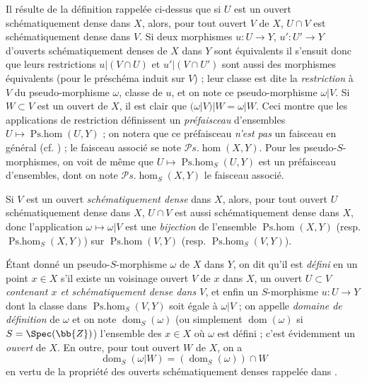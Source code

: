 \begin{env}[20.2.2]
\label{IV.20.2.2}
Il résulte de la définition rappelée ci-dessus que si $U$ est un ouvert schématiquement dense dans $X$, alors, pour tout ouvert $V$ de $X$, $U\cap V$ est schématiquement dense dans $V$.
Si deux morphismes $u:U\to Y$, $u':U'\to Y$ d'ouverts schématiquement denses de $X$ dans $Y$ sont équivalents il s'ensuit donc que leurs restrictions $u|(V\cap U)$ et $u'|(V\cap U')$ sont aussi des morphismes équivalents (pour le préschéma induit sur $V$) ; leur classe est dite la \emph{restriction} à $V$ du pseudo-morphisme $\omega$, classe de $u$, et on note ce pseudo-morphisme $\omega|V$.
Si $W\subset V$ est un ouvert de $X$, il est clair que $(\omega|V)|W=\omega|W$.
Ceci montre que les applications de restriction définissent un \emph{préfaisceau} d'ensembles $U\mapsto\operatorname{Ps.hom}(U,Y)$ ; on notera que ce préfaisceau \emph{n'est pas} un faisceau en général (cf. ) ; le faisceau associé se note $\mathscr{P}\!s.\!\operatorname{hom}(X,Y)$.
Pour les pseudo-$S$-morphismes, on voit de même que $U\mapsto\operatorname{Ps.hom}_S(U,Y)$ est un préfaisceau d'ensembles, dont on note $\mathscr{P}\!s.\!\operatorname{hom}_S(X,Y)$ le faisceau associé.

Si $V$ est un ouvert \emph{schématiquement dense} dans $X$, alors, pour tout ouvert $U$ schématiquement dense dans $X$, $U\cap V$ est aussi schématiquement dense dans $X$, donc l'application $\omega\mapsto\omega|V$ est une \emph{bijection} de l'ensemble $\operatorname{Ps.hom}(X,Y)$ (resp. $\operatorname{Ps.hom}_S(X,Y)$) sur $\operatorname{Ps.hom}(V,Y)$ (resp. $\operatorname{Ps.hom}_S(V,Y)$).
\end{env}

\begin{env}[20.2.3]
\label{IV.20.2.3}
Étant donné un pseudo-$S$-morphisme $\omega$ de $X$ dans $Y$, on dit qu'il est \emph{défini} en un point $x\in X$ s'il existe un voisinage ouvert $V$ de $x$ dans $X$, un ouvert $U\subset V$ \emph{contenant $x$ et schématiquement dense dans $V$}, et enfin un $S$-morphisme $u:U\to Y$ dont la classe dans $\operatorname{Ps.hom}_S(V,Y)$ soit égale à $\omega|V$  ; on appelle \emph{domaine de définition} de $\omega$ et on note $\operatorname{dom}_S(\omega)$ (ou simplement $\operatorname{dom}(\omega)$ si $S=\Spec(\bb{Z})$) l'ensemble des $x\in X$ où $\omega$ est défini ; c'est évidemment un \emph{ouvert} de $X$.
En outre, pour tout ouvert $W$ de $X$, on a
\[
\label{IV.20.2.3.1}
  \operatorname{dom}_S(\omega|W)=(\operatorname{dom}_S(\omega))\cap W
  \tag{20.2.3.1}
\]
en vertu de la propriété des ouverts schématiquement denses rappelée dans .
\end{env}

